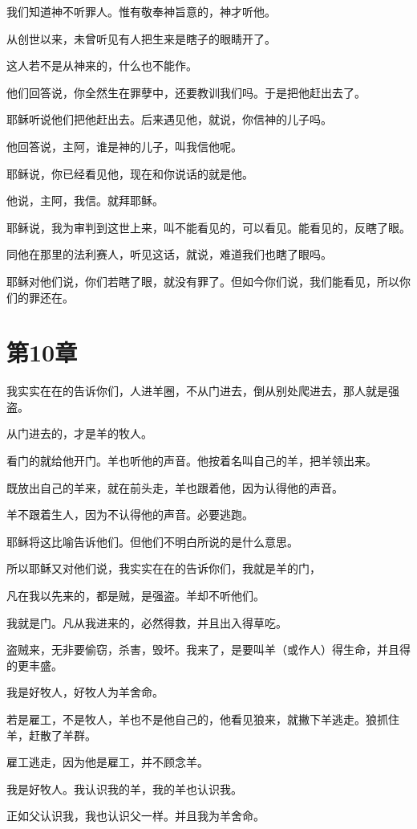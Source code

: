 \documentclass[12pt,oneside]{book}
\begin{document}
我们知道神不听罪人。惟有敬奉神旨意的，神才听他。

从创世以来，未曾听见有人把生来是瞎子的眼睛开了。

这人若不是从神来的，什么也不能作。

他们回答说，你全然生在罪孽中，还要教训我们吗。于是把他赶出去了。

耶稣听说他们把他赶出去。后来遇见他，就说，你信神的儿子吗。

他回答说，主阿，谁是神的儿子，叫我信他呢。

耶稣说，你已经看见他，现在和你说话的就是他。

他说，主阿，我信。就拜耶稣。

耶稣说，我为审判到这世上来，叫不能看见的，可以看见。能看见的，反瞎了眼。

同他在那里的法利赛人，听见这话，就说，难道我们也瞎了眼吗。

耶稣对他们说，你们若瞎了眼，就没有罪了。但如今你们说，我们能看见，所以你们的罪还在。

\chapter{第10章}
我实实在在的告诉你们，人进羊圈，不从门进去，倒从别处爬进去，那人就是强盗。

从门进去的，才是羊的牧人。

看门的就给他开门。羊也听他的声音。他按着名叫自己的羊，把羊领出来。

既放出自己的羊来，就在前头走，羊也跟着他，因为认得他的声音。

羊不跟着生人，因为不认得他的声音。必要逃跑。

耶稣将这比喻告诉他们。但他们不明白所说的是什么意思。

所以耶稣又对他们说，我实实在在的告诉你们，我就是羊的门，

凡在我以先来的，都是贼，是强盗。羊却不听他们。

我就是门。凡从我进来的，必然得救，并且出入得草吃。

盗贼来，无非要偷窃，杀害，毁坏。我来了，是要叫羊（或作人）得生命，并且得的更丰盛。

我是好牧人，好牧人为羊舍命。

若是雇工，不是牧人，羊也不是他自己的，他看见狼来，就撇下羊逃走。狼抓住羊，赶散了羊群。

雇工逃走，因为他是雇工，并不顾念羊。

我是好牧人。我认识我的羊，我的羊也认识我。

正如父认识我，我也认识父一样。并且我为羊舍命。
\end{document}
